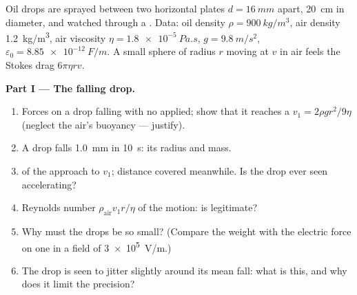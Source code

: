 \begin{problem}
\label{pb:b1:potential-capacitors:1}
Oil drops are sprayed between two horizontal plates $d = \qty{16}{mm}$
apart, \qty{20}{cm} in diameter, and watched through a .
Data: oil density $\rho = \qty{900}{kg/m^3}$, air density
\qty{1.2}{kg/m^3}, air viscosity $\eta = \qty{1.8e-5}{Pa.s}$, $g =
\qty{9.8}{m/s^2}$, $\varepsilon_0 = \qty{8.85e-12}{F/m}$. A small sphere of
radius $r$ moving at $v$ in air feels the Stokes drag $6\pi\eta rv$.

\medskip
\noindent\textbf{Part I --- The falling drop.}
\begin{enumerate}
  \item Forces on a drop falling with no  applied; show that it
        reaches a  $v_1 = 2\rho gr^2/9\eta$ (neglect the
        air's buoyancy --- justify).
  \item A drop falls \qty{1.0}{mm} in \qty{10}{s}: its radius and mass.
  \item {} of the approach to $v_1$; distance covered
        meanwhile. Is the drop ever seen accelerating?
  \item Reynolds number $\rho_{\text{air}}v_1r/\eta$ of the motion: is
         legitimate?
  \item Why must the drops be so small? (Compare the weight with the
        electric force on one  in a field of
        \qty{3e5}{V/m}.)
  \item The drop is seen to jitter slightly around its mean fall: what
        is this, and why does it limit the precision?
\end{enumerate}


\end{problem}
